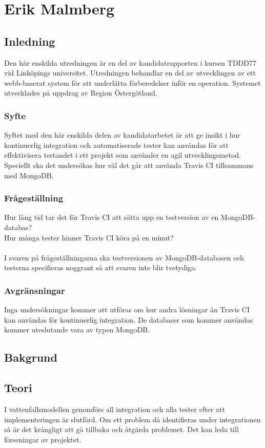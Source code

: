 \section{Erik Malmberg}
\subsection{Inledning}
Den här enskilda utredningen är en del av kandidatrapporten i kursen TDDD77 vid Linköpings universitet. Utredningen behandlar en del av utvecklingen av ett webb-baserat system för att underlätta förberedelser inför en operation. Systemet utvecklades på uppdrag av Region Östergötland.

\subsubsection{Syfte}
Syftet med den här enskilda delen av kandidatarbetet är att ge insikt i hur kontinuerlig integration och automatiserade tester kan användas för att effektivisera testandet i ett projekt som använder en agil utvecklingsmetod. Speciellt ska det undersökas hur väl det går att använda Travis CI tillsammans med MongoDB.

\subsubsection{Frågeställning}
Hur lång tid tar det för Travis CI att sätta upp en testversion av en MongoDB-databas?\\
Hur många tester hinner Travis CI köra på en minut?\\\\

I svaren på frågeställningarna ska testversionen av MongoDB-databasen och testerna specifieras noggrant så att svaren inte blir tvetydiga.

\subsubsection{Avgränsningar}
Inga undersökningar kommer att utföras om hur andra lösningar än Travis CI kan användas för kontinuerlig integration. De databaser som kommer användas kommer uteslutande vara av typen MongoDB.

\subsection{Bakgrund}
\subsection{Teori}
I vattenfallsmodellen genomförs all integration och alla tester efter att implementeringen är slutförd. Om ett problem då identifieras under integrationen så är det krångligt att gå tillbaka och åtgärda problemet. Det kan leda till förseningar av projektet.\\

